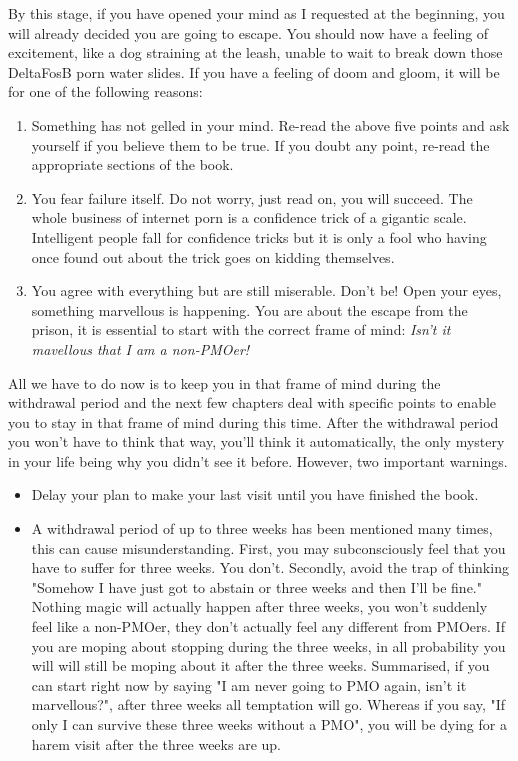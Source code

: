 \documentclass[easypeasy]{subfiles}
\begin{document}
By this stage, if you have opened your mind as I requested at the beginning, you will already decided you are going to escape. You should now have a feeling of excitement, like a dog straining at the leash, unable to wait to break down those DeltaFosB porn water slides. If you have a feeling of doom and gloom, it will be for one of the following reasons:
\begin{enumerate}
  \item Something has not gelled in your mind. Re-read the above five points and ask yourself if you believe them to be true. If you doubt any point, re-read the appropriate sections of the book.

  \item You fear failure itself. Do not worry, just read on, you will succeed. The whole business of internet porn is a confidence trick of a gigantic scale. Intelligent people fall for confidence tricks but it is only a fool who having once found out about the trick goes on kidding themselves.

  \item You agree with everything but are still miserable. Don't be! Open your eyes, something marvellous is happening. You are about the escape from the prison, it is essential to start with the correct frame of mind: \textit{Isn't it mavellous that I am a non-PMOer!}
  \end{enumerate}
All we have to do now is to keep you in that frame of mind during the withdrawal period and the next few chapters deal with specific points to enable you to stay in that frame of mind during this time. After the withdrawal period you won't have to think that way, you'll think it automatically, the only mystery in your life being why you didn't see it before. However, two important warnings.

  \begin{itemize}
  \item Delay your plan to make your last visit until you have finished the book.
  \item A withdrawal period of up to three weeks has been mentioned many times, this can cause misunderstanding. First, you may subconsciously feel that you have to suffer for three weeks. You don't. Secondly, avoid the trap of thinking "Somehow I have just got to abstain or three weeks and then I'll be fine." Nothing magic will actually happen after three weeks, you won't suddenly feel like a non-PMOer, they don't actually feel any different from PMOers. If you are moping about stopping during the three weeks, in all probability you will will still be moping about it after the three weeks. Summarised, if you can start right now by saying "I am never going to PMO again, isn't it marvellous?", after three weeks all temptation will go. Whereas if you say, "If only I can survive these three weeks without a PMO", you will be dying for a harem visit after the three weeks are up.
  \end{itemize}
\end{document}
